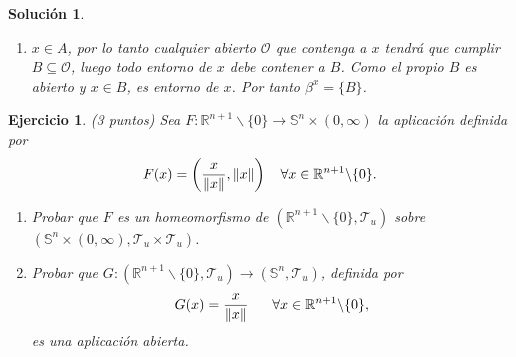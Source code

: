 \documentclass{article}
\theoremstyle{remark,bold} \newtheorem{exercise}{Ejercicio}
\newtheorem*{solution}{Solución}
\begin{document}
\begin{solution}
\begin{enumerate}
    Tomamos $\mathcal{B} = \mathcal{B}_1 \cup \mathcal{B}_2$, por lo
    que acabamos de probar, cualquier abierto de la topología se puede
    expresar como unión de elementos de $\mathcal{B}$ y por tanto
    $\mathcal{B}$ es base de la topología $\mathcal{T}$.

  \item $x \in A$, por lo tanto cualquier abierto
    $\mathcal{\mathcal{O}}$ que contenga a $x$ tendrá que cumplir $B
    \subseteq \mathcal{\mathcal{O}}$, luego todo entorno de $x$ debe
    contener a $B$. Como el propio $B$ es abierto y $x \in B$, es entorno
    de $x$. Por tanto $\beta^x = \{B\}$.
    
  \end{enumerate}
  
\end{solution}

\newpage

\begin{exercise} (3 puntos) Sea $F : \mathbb{R}^{n+1} \backslash \{0\}
  \longrightarrow \mathbb{S}^n \times (0, \infty)$ la aplicación
  definida por \vspace{2mm}
  \[F(x) = \bigg(\frac{x}{\|x\|},\|x\|\bigg) \hspace{4mm} \forall x
    \in \mathbb{R}^{n+1} \backslash \{0\}.  \vspace{2mm}\]

  \begin{enumerate}

  \item Probar que $F$ es un homeomorfismo de $(\mathbb{R}^{n+1}
    \backslash \{0\}, \mathcal{T}_u)$ sobre $(\mathbb{S}^n \times (0,
    \infty), \mathcal{T}_u \times \mathcal{T}_u)$.

  \item Probar que $G : (\mathbb{R}^{n+1} \backslash \{0\},
    \mathcal{T}_u) \longrightarrow (\mathbb{S}^n, \mathcal{T}_u)$,
    definida por \vspace{2mm}
    \[G(x) = \frac{x}{\|x\|} \hspace{6mm} \forall x \in
      \mathbb{R}^{n+1} \backslash \{0\}, \vspace{-2mm}\] es una aplicación
    abierta.

  \end{enumerate}
  
\end{exercise}
\end{document}
